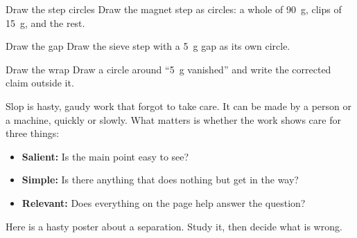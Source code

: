 \begin{puzzle}{Draw the step circles}
Draw the magnet step as circles: a whole of 90~g, clips of 15~g, and the rest.
\begin{center}\end{center}
\end{puzzle}

\begin{puzzle}{Draw the gap}
Draw the sieve step with a 5~g gap as its own circle.
\begin{center}\end{center}
\end{puzzle}

\begin{puzzle}{Draw the wrap}
Draw a circle around ``5~g vanished'' and write the corrected claim outside it.
\begin{center}\end{center}
\end{puzzle}

\clearpage
\thispagestyle{fancy}\label{slop}
Slop is hasty, gaudy work that forgot to take care. It can be made by a person or a machine, quickly or slowly. What matters is whether the work shows care for three things:
\begin{itemize}[leftmargin=1.6em]
\item \textbf{Salient:} Is the main point easy to see?
\item \textbf{Simple:} Is there anything that does nothing but get in the way?
\item \textbf{Relevant:} Does everything on the page help answer the question?
\end{itemize}

Here is a hasty poster about a separation. Study it, then decide what is wrong.

